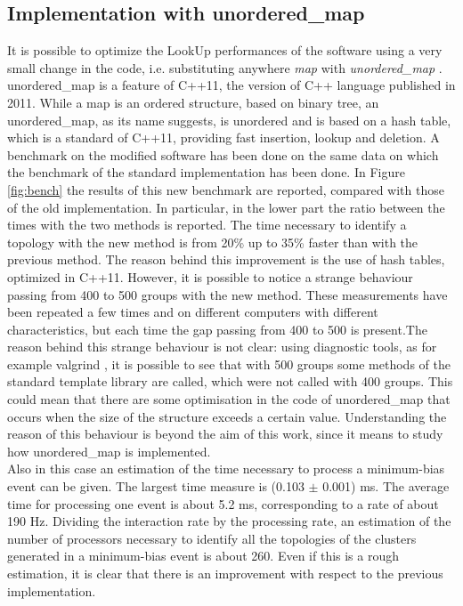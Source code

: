 \subsection{Implementation with unordered\_map}
It is possible to optimize the LookUp performances of the software using a very small change in the code, i.e. substituting anywhere \textit{map} with \textit{unordered\_map} \cite{unord}. unordered\_map is a feature of C++11, the version of C++ language published in 2011. While a map is an ordered structure, based on binary tree, an unordered\_map, as its name suggests, is unordered and is based on a hash table, which is a standard of C++11, providing fast insertion, lookup and deletion. A benchmark on the modified software has been done on the same data on which the benchmark of the standard implementation has been done.
In Figure \ref{fig:bench} the results of this new benchmark are reported, compared with those of the old implementation. In particular, in the lower part the ratio between the times with the two methods is reported. The time necessary to identify a topology with the new method is from 20\% up to 35\% faster than with the previous method. The reason behind this improvement is the use of hash tables, optimized in C++11. However, it is possible to notice a strange behaviour passing from 400 to 500 groups with the new method. These measurements have been repeated a few times and on different computers with different characteristics, but each time the gap passing from 400 to 500 is present.The reason behind this strange behaviour is not clear: using diagnostic tools, as for example valgrind \cite{valgrind}, it is possible to see that with 500 groups some methods of the standard template library are called, which were not called with 400 groups. This could mean that there are some optimisation in the code of unordered\_map that occurs when the size of the structure exceeds a certain value. Understanding the reason of this behaviour is beyond the aim of this work, since it means to study how unordered\_map is implemented.\\
Also in this case an estimation of the time necessary to process a minimum-bias event can be given. The largest time measure is (0.103 $\pm$ 0.001) ms. The average time for processing one event is about 5.2 ms, corresponding to a rate of about 190 Hz. Dividing the interaction rate by the processing rate, an estimation of the number of processors necessary to identify all the topologies of the clusters generated in a minimum-bias event is about 260. Even if this is a rough estimation, it is clear that there is an improvement with respect to the previous implementation.
